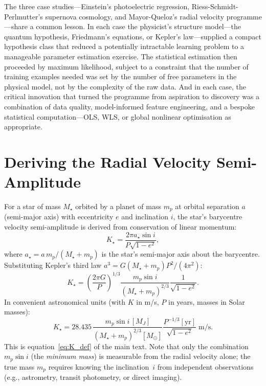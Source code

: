 \documentclass[12pt]{article}
\begin{document}
The three case studies---Einstein's photoelectric regression,
Riess-Schmidt-Perlmutter's supernova cosmology, and Mayor-Queloz's
radial velocity programme---share a common lesson.  In each case the
physicist's structure model---the quantum hypothesis, Friedmann's
equations, or Kepler's law---supplied a compact hypothesis class that
reduced a potentially intractable learning problem to a manageable
parameter estimation exercise.  The statistical estimation then
proceeded by maximum likelihood, subject to a constraint that the
number of training examples needed was set by the number of free
parameters in the physical model, not by the complexity of the raw
data.  And in each case, the critical innovation that turned the
programme from aspiration to discovery was a combination of data
quality, model-informed feature engineering, and a bespoke statistical
computation---OLS, WLS, or global nonlinear optimisation as appropriate.

\appendix

\section{Deriving the Radial Velocity Semi-Amplitude}
\label{app:K}

For a star of mass $M_\star$ orbited by a planet of mass $m_p$ at
orbital separation $a$ (semi-major axis) with eccentricity $e$
and inclination $i$, the star's barycentre velocity semi-amplitude
is derived from conservation of linear momentum:
\begin{equation}\label{eq:K_derive}
  K_\star = \frac{2\pi a_\star \sin i}{P\sqrt{1-e^2}},
\end{equation}
where $a_\star = a\,m_p/(M_\star + m_p)$ is the star's semi-major
axis about the barycentre.  Substituting Kepler's third law
$a^3 = G(M_\star+m_p)P^2/(4\pi^2)$:
\begin{equation}\label{eq:K_full}
  K_\star = \left(\frac{2\pi G}{P}\right)^{1/3}
  \frac{m_p \sin i}{(M_\star + m_p)^{2/3}}
  \frac{1}{\sqrt{1-e^2}}.
\end{equation}
In convenient astronomical units (with $K$ in m/s, $P$ in years, masses
in Solar masses):
\begin{equation}\label{eq:K_units}
  K_\star = 28.435\,
  \frac{m_p\sin i\,[M_J]}{(M_\star+m_p)^{2/3}[M_\odot]}
  \frac{P^{-1/3}[\text{yr}]}{\sqrt{1-e^2}}\;\text{m/s}.
\end{equation}
This is equation~\eqref{eq:K_def} of the main text.  Note that only
the combination $m_p\sin i$ (the \emph{minimum mass}) is measurable
from the radial velocity alone; the true mass $m_p$ requires knowing
the inclination~$i$ from independent observations (e.g., astrometry,
transit photometry, or direct imaging).
\end{document}
